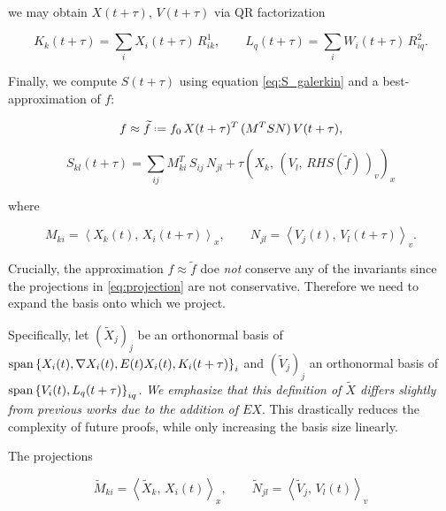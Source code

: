 we may obtain $X(t + \tau)$, $V(t + \tau)$ 
via QR factorization

\begin{equation}
    K_k (t + \tau) = \sum_i X_i (t + \tau)\, R^1_{i k}, \quad\quad
    L_q (t + \tau) = \sum_i W_i (t + \tau)\, R^2_{i q} . 
\end{equation}

Finally, we compute $S(t + \tau)$ using equation \ref{eq:S_galerkin} and a 
best-approximation of $f$:

\begin{equation}
    f \approx \widetilde{ f } \defeq f_0\, X(t + \tau)^T\, (M^T S N)\, V(t + \tau), 
\end{equation}

\begin{equation}\label{eq:S_step}
    S_{k l} (t + \tau) = \sum_{i j} M^T_{k i}\, S_{i j}\, N_{j l} 
        + \tau \left( X_k,\, \left( V_l,\, 
            RHS( \widetilde{ f } )\, 
        \right)_v \right)_x
\end{equation}

where 

\begin{equation}\label{eq:projection}
    M_{k i} = \left\langle X_k (t),\, X_i (t + \tau) \right\rangle_x, \quad\quad
    N_{j l} = \left\langle V_j (t),\, V_l (t + \tau) \right\rangle_v . 
\end{equation}

Crucially, the approximation $f \approx \widetilde{ f }$ doe \emph{not} conserve any of 
the invariants since the projections in \ref{eq:projection} are not conservative. 
Therefore we need to expand the basis onto which we project. 

Specifically, let 
$(\widetilde{ X }_j)_j$ be an orthonormal basis of 
$\text{span} \left\{ X_i (t), \nabla X_i (t), E(t)X_i (t), K_i (t + \tau) \right\}_i$ and 
$(\widetilde{ V }_j)_j$ an orthonormal basis of 
$\text{span} \left\{ V_i (t), L_q (t + \tau) \right\}_{i q}$. 
\emph{We emphasize that this definition of $\widetilde{ X }$ differs slightly from 
previous works due to the addition of $E X$}. This drastically reduces the complexity of 
future proofs, while only increasing the basis size linearly. 

The projections 

\begin{equation}\label{eq:conservative_projection}
    \widetilde{ M }_{k i} = \left\langle \widetilde{ X }_k,\, X_i (t) \right\rangle_x, \quad\quad
    \widetilde{ N }_{j l} = \left\langle \widetilde{ V }_j,\, V_l (t) \right\rangle_v 
\end{equation}

